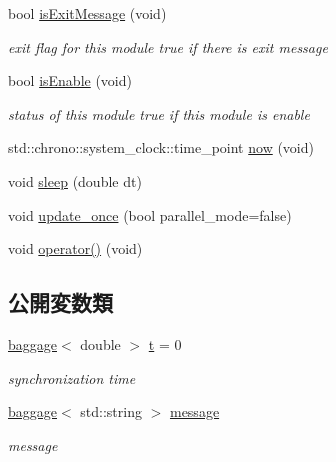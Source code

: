 \begin{DoxyCompactItemize}
bool \hyperlink{classfractal_1_1Module_a9b79e3353f502cb49f7bb713266ebdef}{is\+Exit\+Message} (void)
\begin{DoxyCompactList}\small\item\em exit flag for this module  true if there is exit message \end{DoxyCompactList}\item 
bool \hyperlink{classfractal_1_1Module_a74c4dc6f8d5f57d885b0da633ec12e1f}{is\+Enable} (void)
\begin{DoxyCompactList}\small\item\em status of this module  true if this module is enable \end{DoxyCompactList}\item 
std\+::chrono\+::system\+\_\+clock\+::time\+\_\+point \hyperlink{classfractal_1_1Module_a4618e1597d01313ffb69116ed3dcdbfa}{now} (void)
\item 
void \hyperlink{classfractal_1_1Module_aba781b23b4f5ae00609f1daee3a0072c}{sleep} (double dt)
\item 
void \hyperlink{classfractal_1_1Module_abc2bf9795de848ecef0bd2e339a81e0d}{update\+\_\+once} (bool parallel\+\_\+mode=false)
\item 
void \hyperlink{classfractal_1_1Module_ae738b02bc66ce9aaf425902bd01b9503}{operator()} (void)
\end{DoxyCompactItemize}
\subsection*{公開変数類}
\begin{DoxyCompactItemize}
\item 
\hyperlink{classfractal_1_1baggage}{baggage}$<$ double $>$ \hyperlink{classfractal_1_1Module_ac14a8d440a0a4f7a0be952a902c3717e}{t} = 0
\begin{DoxyCompactList}\small\item\em synchronization time \end{DoxyCompactList}\item 
\hyperlink{classfractal_1_1baggage}{baggage}$<$ std\+::string $>$ \hyperlink{classfractal_1_1Module_a8e59ac0be2426bde4e79a589ffc4cce4}{message}
\begin{DoxyCompactList}\small\item\em message \end{DoxyCompactList}\end{DoxyCompactItemize}
